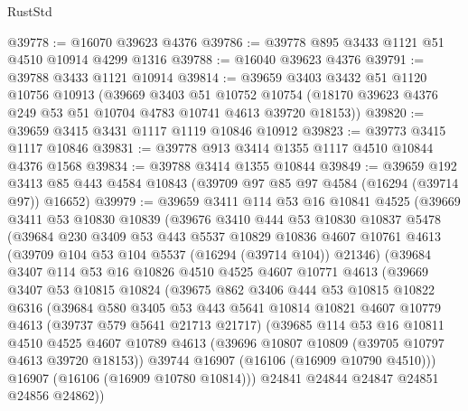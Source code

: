 \begin{lexlean}{RustStd}
\begin{coremodule}
@39778 := @16070 @39623 @4376
@39786 := @39778 @895 @3433 @1121 @51 @4510 @10914 @4299 @1316
@39788 := @16040 @39623 @4376
@39791 := @39788 @3433 @1121 @10914
@39814 := @39659
    @3403
    @3432
    @51
    @1120
    @10756
    @10913
    (@39669
      @3403
      @51
      @10752
      @10754
      (@18170 @39623 @4376 @249 @53 @51 @10704 @4783 @10741 @4613 @39720 @18153))
@39820 := @39659 @3415 @3431 @1117 @1119 @10846 @10912
@39823 := @39773 @3415 @1117 @10846
@39831 := @39778 @913 @3414 @1355 @1117 @4510 @10844 @4376 @1568
@39834 := @39788 @3414 @1355 @10844
@39849 := @39659
    @192
    @3413
    @85
    @443
    @4584
    @10843
    (@39709 @97 @85 @97 @4584 (@16294 (@39714 @97)) @16652)
@39979 := @39659
    @3411
    @114
    @53
    @16
    @10841
    @4525
    (@39669
      @3411
      @53
      @10830
      @10839
      (@39676
        @3410
        @444
        @53
        @10830
        @10837
        @5478
        (@39684
          @230
          @3409
          @53
          @443
          @5537
          @10829
          @10836
          @4607
          @10761
          @4613
          (@39709 @104 @53 @104 @5537 (@16294 (@39714 @104)) @21346)
          (@39684
            @3407
            @114
            @53
            @16
            @10826
            @4510
            @4525
            @4607
            @10771
            @4613
            (@39669
              @3407
              @53
              @10815
              @10824
              (@39675
                @862
                @3406
                @444
                @53
                @10815
                @10822
                @6316
                (@39684
                  @580
                  @3405
                  @53
                  @443
                  @5641
                  @10814
                  @10821
                  @4607
                  @10779
                  @4613
                  (@39737 @579 @5641 @21713 @21717)
                  (@39685
                    @114
                    @53
                    @16
                    @10811
                    @4510
                    @4525
                    @4607
                    @10789
                    @4613
                    (@39696 @10807 @10809 (@39705 @10797 @4613 @39720 @18153))
                    @39744
                    @16907
                    (@16106 (@16909 @10790 @4510)))
                  @16907
                  (@16106 (@16909 @10780 @10814)))
                @24841
                @24844
                @24847
                @24851
                @24856
                @24862))

\end{coremodule}
\end{lexlean}
